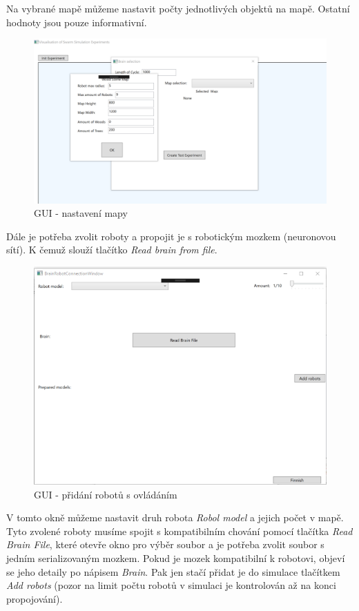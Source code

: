 \documentclass[12pt, oneside]{article}
\begin{document}
\clearpage
Na vybrané mapě můžeme nastavit počty jednotlivých objektů na mapě. Ostatní hodnoty jsou pouze informativní.
\par
\begin{figure}[h]\centering
	\includegraphics[width=\columnwidth]{img/map_sel.png}
	\caption{GUI - nastavení mapy} 
\end{figure} 
\clearpage
Dále je potřeba zvolit roboty a propojit je s robotickým mozkem (neuronovou sítí). K čemuž slouží tlačítko \textit{Read brain from file}. 
\par
\begin{figure}[h]\centering
	\includegraphics[width=\columnwidth]{img/brain_con.png}
	\caption{GUI - přidání robotů s ovládáním } 
\end{figure} 
V tomto okně můžeme nastavit druh robota \textit{Robol model} a jejich počet v mapě. Tyto zvolené roboty musíme spojit s kompatibilním chování pomocí tlačítka \textit{Read Brain File}, které otevře okno pro výběr soubor a je potřeba zvolit soubor s jedním serializovaným mozkem. Pokud je mozek kompatibilní k robotovi, objeví se jeho detaily po nápisem \textit{Brain}. Pak jen stačí přidat je do simulace tlačítkem \textit{Add robots} (pozor na limit počtu robotů v simulaci je kontrolován až na konci propojování).
\end{document}
